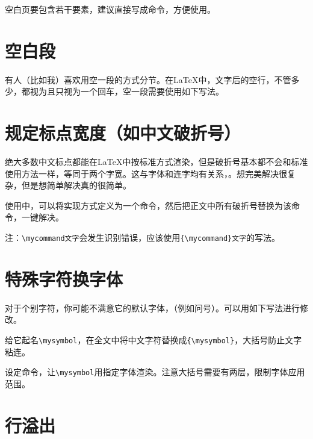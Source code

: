 \documentclass[10pt,openany]{book}
\begin{document}
空白页要包含若干要素，建议直接写成命令，方便使用。



\section{空白段}
\label{blankpar}

有人（比如我）喜欢用空一段的方式分节。在{\LaTeX}中，文字后的空行，不管多少，都视为且只视为一个回车，空一段需要使用如下写法。



\section{规定标点宽度（如中文破折号）}
\label{chsline}

绝大多数中文标点都能在{\LaTeX}中按标准方式渲染，但是破折号基本都不会和标准使用方法一样，等同于两个字宽。这与字体和连字均有关系，。想完美解决很复杂，但是想简单解决真的很简单。



使用中，可以将实现方式定义为一个命令，然后把正文中所有破折号替换为该命令，一键解决。

注：\texttt{\textbackslash{}mycommand\hspace{-0.1em}文字}会发生识别错误，应该使用\texttt{\{\textbackslash{}mycommand\}文字}的写法。

\section{特殊字符换字体}

对于个别字符，你可能不满意它的默认字体，（例如问号）。可以用如下写法进行修改。

给它起名\texttt{\textbackslash{}mysymbol}，在全文中将中文字符替换成\texttt{\{\textbackslash{}mysymbol\}}，大括号防止文字粘连。

设定命令，让\texttt{\textbackslash{}mysymbol}用指定字体渲染。注意大括号需要有两层，限制字体应用范围。



\section{行溢出}
\end{document}
